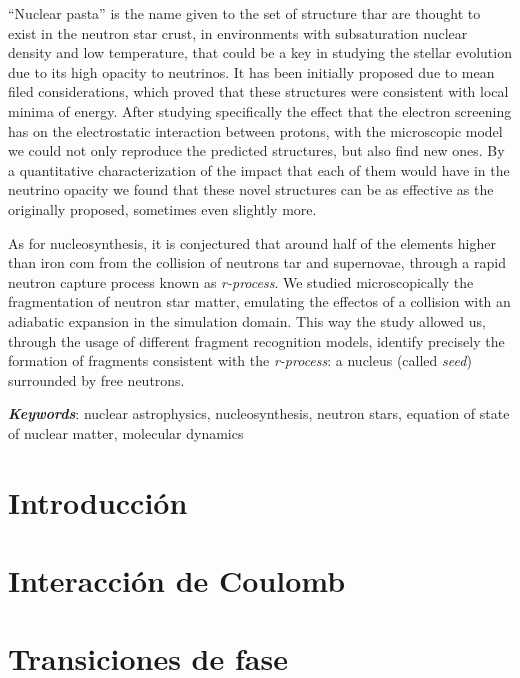 \documentclass[12pt]{book}
\begin{document}
``Nuclear pasta'' is the name given to the set of structure thar are thought to exist in the neutron star crust, in environments with subsaturation nuclear density and low temperature, that could be a key in studying the stellar evolution due to its high opacity to neutrinos.
It has been initially proposed due to mean filed considerations, which proved that these structures were consistent with local minima of energy.
After studying specifically the effect that the electron screening has on the electrostatic interaction between protons, with the microscopic model we could not only reproduce the predicted structures, but also find new ones.
By a quantitative characterization of the impact that each of them would have in the neutrino opacity we found that these novel structures can be as effective as the originally proposed, sometimes even slightly more.

As for nucleosynthesis, it is conjectured that around half of the elements higher than iron com from the collision of neutrons tar and supernovae, through a rapid neutron capture process known as \emph{r-process}.
We studied microscopically the fragmentation of neutron star matter, emulating the effectos of a collision with an adiabatic expansion in the simulation domain.
This way the study allowed us, through the usage of different fragment recognition models, identify precisely the formation of fragments consistent with the \emph{r-process}: a nucleus (called \emph{seed}) surrounded by free neutrons.

\emph{\textbf{Keywords}}: nuclear astrophysics, nucleosynthesis, neutron stars, equation of state of nuclear matter, molecular dynamics

\tableofcontents
\listoffigures
\mainmatter
\chapter[Introducción]{Introducción}
\label{ch:introduccion}



\chapter[Efecto de Coulomb]{Interacción de Coulomb}
\label{ch:coulomb}


\chapter[Transiciones de fase]{Transiciones de fase}
\label{ch:transicion}

\end{document}
